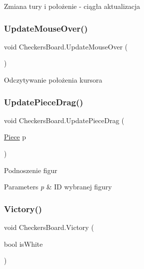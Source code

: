 Zmiana tury i położenie -\/ ciągła aktualizacja 

\mbox{\label{class_checkers_board_aa23396a0d7ea31dc496f4204b78fe1ba}} 
\subsubsection{\texorpdfstring{UpdateMouseOver()}{UpdateMouseOver()}}
{\footnotesize\ttfamily void Checkers\+Board.\+Update\+Mouse\+Over (\begin{DoxyParamCaption}{ }\end{DoxyParamCaption})\hspace{0.3cm}{\ttfamily [private]}}



Odczytywanie położenia kursora 

\mbox{\label{class_checkers_board_a0f4c37cf6ad7e2b7a275c926b1dd056d}} 
\subsubsection{\texorpdfstring{UpdatePieceDrag()}{UpdatePieceDrag()}}
{\footnotesize\ttfamily void Checkers\+Board.\+Update\+Piece\+Drag (\begin{DoxyParamCaption}\item[{\mbox{\hyperlink{class_piece}{Piece}}}]{p }\end{DoxyParamCaption})\hspace{0.3cm}{\ttfamily [private]}}



Podnoszenie figur 


\begin{DoxyParams}{Parameters}
{\em p} & ID wybranej figury\\
\hline
\end{DoxyParams}
\mbox{\label{class_checkers_board_aa4fb3184676cf22bd5958b6484e86c34}} 
\subsubsection{\texorpdfstring{Victory()}{Victory()}}
{\footnotesize\ttfamily void Checkers\+Board.\+Victory (\begin{DoxyParamCaption}\item[{bool}]{is\+White }\end{DoxyParamCaption})\hspace{0.3cm}{\ttfamily [private]}}






